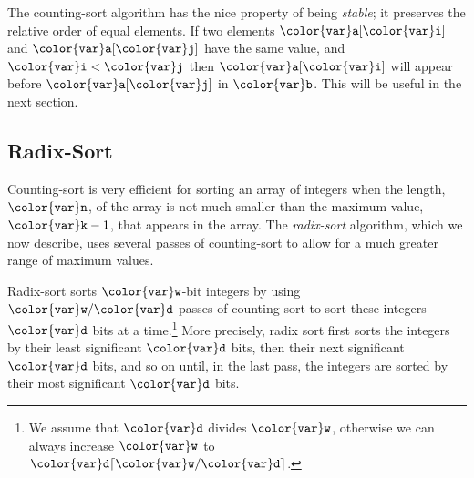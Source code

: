 \documentclass[10pt]{book}
\theoremstyle{plain}
\theoremstyle{definition}
\begin{document}
The counting-sort algorithm has the nice property of being \emph{stable};
%
it preserves the relative order of equal elements.  If two elements
\ensuremath{\mathtt{{\color{var}a}[{\color{var}i}]}} and \ensuremath{\mathtt{{\color{var}a}[{\color{var}j}]}} have the same value, and $\ensuremath{\mathtt{{\color{var}i}}}<\ensuremath{\mathtt{{\color{var}j}}}$ then \ensuremath{\mathtt{{\color{var}a}[{\color{var}i}]}} will
appear before \ensuremath{\mathtt{{\color{var}a}[{\color{var}j}]}} in \ensuremath{\mathtt{{\color{var}b}}}.  This will be useful in the next section.

\subsection{Radix-Sort}

Counting-sort is very efficient for sorting an array of integers when the
length, \ensuremath{\mathtt{{\color{var}n}}}, of the array is not much smaller than the maximum value,
$\ensuremath{\mathtt{{\color{var}k}}}-1$, that appears in the array.  The \emph{radix-sort}
%
algorithm,
which we now describe, uses several passes of counting-sort to allow
for a much greater range of maximum values.

Radix-sort sorts \ensuremath{\mathtt{{\color{var}w}}}-bit integers by using $\ensuremath{\mathtt{{\color{var}w}}}/\ensuremath{\mathtt{{\color{var}d}}}$ passes of counting-sort
to sort these integers \ensuremath{\mathtt{{\color{var}d}}} bits at a time.\footnote{We assume that
\ensuremath{\mathtt{{\color{var}d}}} divides \ensuremath{\mathtt{{\color{var}w}}}, otherwise we can always increase \ensuremath{\mathtt{{\color{var}w}}} to $\ensuremath{\mathtt{{\color{var}d}}}\lceil
\ensuremath{\mathtt{{\color{var}w}}}/\ensuremath{\mathtt{{\color{var}d}}}\rceil$.}  More precisely, radix sort first sorts the integers by
their least significant \ensuremath{\mathtt{{\color{var}d}}} bits, then their next significant \ensuremath{\mathtt{{\color{var}d}}} bits,
and so on until, in the last pass, the integers are sorted by their most
significant \ensuremath{\mathtt{{\color{var}d}}} bits.
\end{document}

